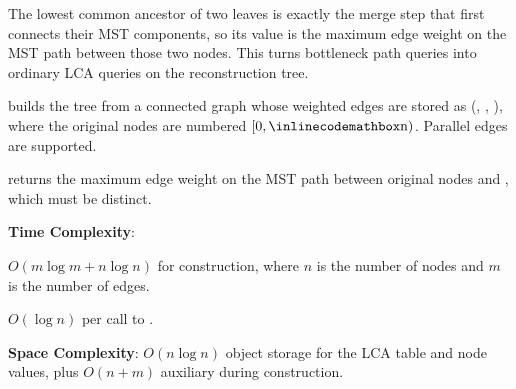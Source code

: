The lowest common ancestor of two leaves is exactly the merge step that first connects their MST components, so its value is the maximum edge weight on the MST path between those two nodes. This turns bottleneck path queries into ordinary LCA queries on the reconstruction tree.

\begin{compactitem}
  \item {} builds the tree from a connected graph whose weighted edges are stored as (, , ), where the  original nodes are numbered $[0, {\inlinecodemath{n}})$. Parallel edges are supported.
  \item {} returns the maximum edge weight on the MST path between original nodes  and , which must be distinct.
\end{compactitem}

\textbf{Time Complexity}:
\begin{compactitem}
  \item $O(m \log m + n \log n)$ for construction, where $n$ is the number of nodes and $m$ is the number of edges.
  \item $O(\log n)$ per call to .
\end{compactitem}

\textbf{Space Complexity}: $O(n \log n)$ object storage for the LCA table and node values, plus $O(n + m)$ auxiliary during construction.

